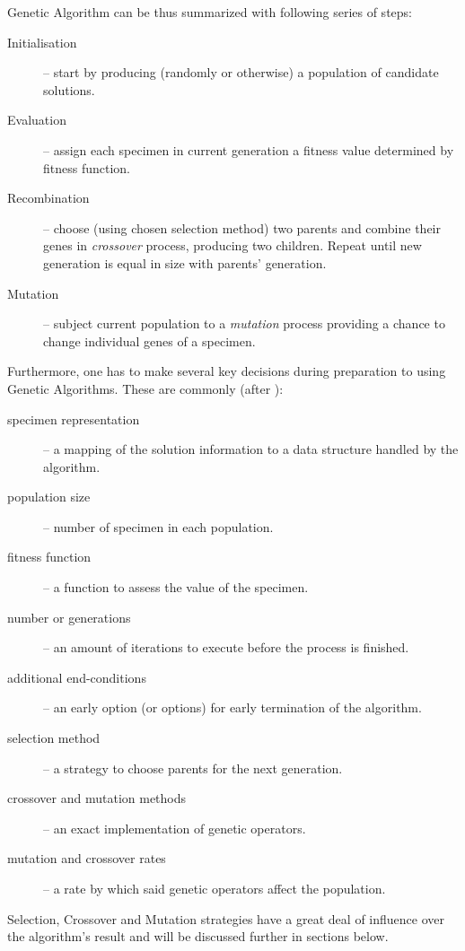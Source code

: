 Genetic Algorithm can be thus summarized with following series of steps:
\begin{description}
    \item[Initialisation] -- start by producing (randomly or otherwise) a population of candidate solutions.
    \item[Evaluation] -- assign each specimen in current generation a fitness value determined by fitness function.
    \item[Recombination] -- choose (using chosen selection method) two parents and combine their genes in \textit{crossover} process, producing two children. Repeat until new generation is equal in size with parents' generation.  %
    \item[Mutation] -- subject current population to a \textit{mutation} process providing a chance to change individual genes of a specimen.
\end{description}

Furthermore, one has to make several key decisions during preparation to using Genetic Algorithms. These are commonly (after \cite{kozagp}):
\begin{description}
    \item[specimen representation] -- a mapping of the solution information to a data structure handled by the algorithm.
    \item[population size] -- number of specimen in each population.
    \item[fitness function] -- a function to assess the value of the specimen.
    \item[number or generations] -- an amount of iterations to execute before the process is finished.
    \item[additional end-conditions] -- an early option (or options) for early termination of the algorithm.
    \item[selection method] -- a strategy to choose parents for the next generation.
    \item[crossover and mutation methods] -- an exact implementation of genetic operators.
    \item[mutation and crossover rates] -- a rate by which said genetic operators affect the population.
\end{description}

Selection, Crossover and Mutation strategies have a great deal of influence over the algorithm's result and will be discussed further in sections below.
